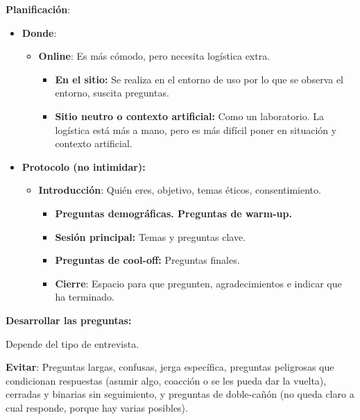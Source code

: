 \documentclass[12pt]{report} %
\begin{document}
\textbf{Planificación}:

\begin{itemize}

\item
  \textbf{Donde}:

  \begin{itemize}
  
  \item
    \textbf{Online}: Es más cómodo, pero necesita logística extra.

    \begin{itemize}
    
    \item
      \textbf{En el sitio:} Se realiza en el entorno de uso por lo que
      se observa el entorno, suscita preguntas.
    \item
      \textbf{Sitio neutro o contexto artificial:} Como un laboratorio.
      La logística está más a mano, pero es más difícil poner en
      situación y contexto artificial.
    \end{itemize}
  \end{itemize}
\item
  \textbf{Protocolo (no intimidar):}

  \begin{itemize}
  
  \item
    \textbf{Introducción}: Quién eres, objetivo, temas éticos,
    consentimiento.

    \begin{itemize}
    
    \item
      \textbf{Preguntas demográficas. Preguntas de warm-up.}
    \item
      \textbf{Sesión principal:} Temas y preguntas clave.
    \item
      \textbf{Preguntas de cool-off:} Preguntas finales.
    \item
      \textbf{Cierre}: Espacio para que pregunten, agradecimientos e
      indicar que ha terminado.
    \end{itemize}
  \end{itemize}
\end{itemize}

\textbf{Desarrollar las preguntas:}

Depende del tipo de entrevista.

\textbf{Evitar}: Preguntas largas, confusas, jerga específica, preguntas
peligrosas que condicionan respuestas (asumir algo, coacción o se les
pueda dar la vuelta), cerradas y binarias sin seguimiento, y preguntas
de doble-cañón (no queda claro a cual responde, porque hay varias
posibles).
\end{document}
